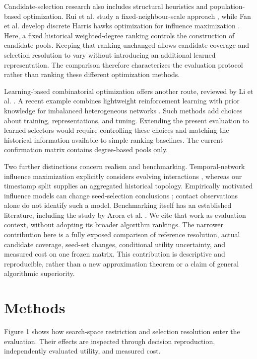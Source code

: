 \documentclass[smallextended]{svjour3}
\begin{document}
Candidate-selection research also includes structural heuristics and population-based optimization. Rui et al. study a fixed-neighbour-scale approach \cite{ref12}, while Fan et al. develop discrete Harris hawks optimization for influence maximization \cite{ref13}. Here, a fixed historical weighted-degree ranking controls the construction of candidate pools. Keeping that ranking unchanged allows candidate coverage and selection resolution to vary without introducing an additional learned representation. The comparison therefore characterizes the evaluation protocol rather than ranking these different optimization methods.

Learning-based combinatorial optimization offers another route, reviewed by Li et al. \cite{ref10}. A recent example combines lightweight reinforcement learning with prior knowledge for imbalanced heterogeneous networks \cite{ref14}. Such methods add choices about training, representations, and tuning. Extending the present evaluation to learned selectors would require controlling these choices and matching the historical information available to simple ranking baselines. The current confirmation matrix contains degree-based pools only.

Two further distinctions concern realism and benchmarking. Temporal-network influence maximization explicitly considers evolving interactions \cite{ref11}, whereas our timestamp split supplies an aggregated historical topology. Empirically motivated influence models can change seed-selection conclusions \cite{ref15}; contact observations alone do not identify such a model. Benchmarking itself has an established literature, including the study by Arora et al. \cite{ref16}. We cite that work as evaluation context, without adopting its broader algorithm rankings. The narrower contribution here is a fully exposed comparison of reference resolution, actual candidate coverage, seed-set changes, conditional utility uncertainty, and measured cost on one frozen matrix. This contribution is descriptive and reproducible, rather than a new approximation theorem or a claim of general algorithmic superiority.


\section{Methods}

Figure 1 shows how search-space restriction and selection resolution enter the evaluation. Their effects are inspected through decision reproduction, independently evaluated utility, and measured cost.
\end{document}
